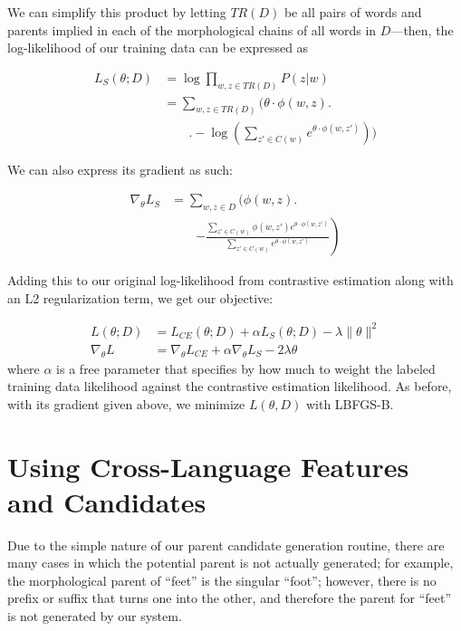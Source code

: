 \documentclass[11pt,twocolumn]{article}
\begin{document}
We can simplify this product by letting $TR(D)$ be all pairs of words and parents implied in each of
the morphological chains of all words in $D$---then, the log-likelihood of our training data can be expressed as

\begin{equation}
    \begin{split}
        L_S(\theta; D) &= \log{\prod_{w, z \in TR(D)} P(z|w)} \\
                       &= \sum_{w, z \in TR(D)} \Bigg(\theta \cdot \phi(w, z) \Bigg. \\
                       &\qquad\Bigg. - \log\left(\sum_{z' \in C(w)} e^{\theta \cdot \phi(w, z')} \right)\Bigg)
   \end{split}
\end{equation}

We can also express its gradient as such:

\begin{equation}
    \begin{split}
        \nabla_\theta L_S &= \sum_{w, z \in D} \Bigg(\phi(w, z) \Bigg. \\
                          &\qquad\left. - \frac{\sum_{z' \in C(w)} \phi(w, z') e^{\theta \cdot \phi(w, z')} }{\sum_{z' \in C(w)} e^{\theta \cdot \phi(w, z')}}\right)
    \end{split}
\end{equation}

Adding this to our original log-likelihood from contrastive estimation
along with an L2 regularization term, we get our objective:

\begin{equation}
    \begin{split}
        L(\theta; D) &= L_{CE}(\theta; D) + \alpha L_S(\theta; D) - \lambda \| \theta \|^2 \\
        \nabla_\theta L &= \nabla_\theta L_{CE} + \alpha \nabla_\theta L_S - 2\lambda \theta
    \end{split}
\end{equation}
where $\alpha$ is a free parameter that specifies by how much to weight the labeled training data likelihood
against the contrastive estimation likelihood.
As before, with its gradient given above, we minimize $L(\theta, D)$ with LBFGS-B.

\section{Using Cross-Language Features and Candidates}
Due to the simple nature of our parent candidate generation routine,
there are many cases in which the potential parent is not actually generated;
for example, the morphological parent of ``feet'' is the singular ``foot'';
however, there is no prefix or suffix that turns one into the other, and
therefore the parent for ``feet'' is not generated by our system.
\end{document}
